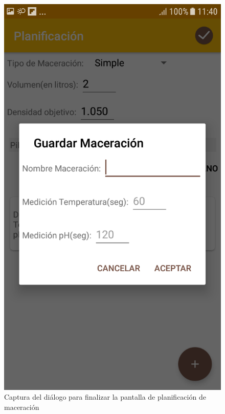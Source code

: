                 \begin{figure}[h]
                    \centering
                     \includegraphics[scale=0.2]{software/ScreenCapture/PlanningActivity-Finish.jpg}
                    \caption{Captura del diálogo para finalizar la pantalla de planificación de maceración}
                    \label{fig:CapturaPlanFinish}
                \end{figure}

               
